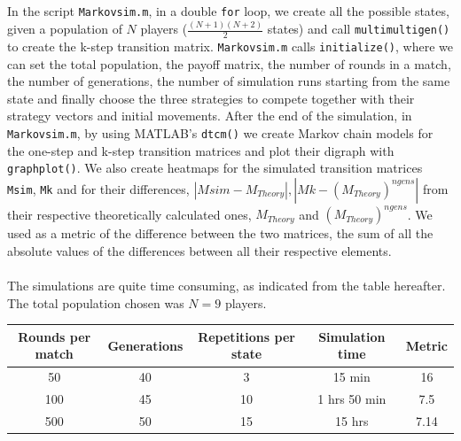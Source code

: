 \documentclass[12pt]{article}
\begin{document}
\\\\
In the script \texttt{Markovsim.m}, in a double \texttt{for} loop, we create all the possible states, given a population of $N$ players ($\frac{(N+1)(N+2)}{2}$ states) and call \texttt{multimultigen()} to create the k-step transition matrix. \texttt{Markovsim.m} calls \texttt{initialize()}, where we can set the total population, the payoff matrix, the number of rounds in a match, the number of generations, the number of simulation runs starting from the same state and finally choose the three strategies to compete together with their strategy vectors and initial movements. After the end of the simulation, in \texttt{Markovsim.m}, by using MATLAB's \texttt{dtcm()} we create Markov chain models for the one-step and k-step transition matrices and plot their digraph with \texttt{graphplot()}. We also create heatmaps for the simulated transition matrices \texttt{Msim}, \texttt{Mk} and for their differences, $|Msim-M_{Theory}|, |Mk-{(M_{Theory})}^{ngens}|$ from their respective theoretically calculated ones, $M_{Theory}$ and ${(M_{Theory})}^{ngens}$. We used as a metric of the difference between the two matrices, the sum of all the absolute values of the differences between all their respective elements.
\\\\
The simulations are quite time consuming, as indicated from the table hereafter. The total population chosen was $N=9$ players.

\begin{center}
\begin{tabular}{|c|c|c|c|c|}
 \hline
 Rounds per match & Generations & Repetitions per state & Simulation time & Metric \\ 
 \hline
50 & 40 & 3 & 15 min & 16 \\
 \hline
100 &   45 & 10 & 1 hrs 50 min & 7.5 \\
 \hline
500 & 50 & 15 & 15 hrs & 7.14 \\
 \hline
\end{tabular}
\end{center}
\end{document}
